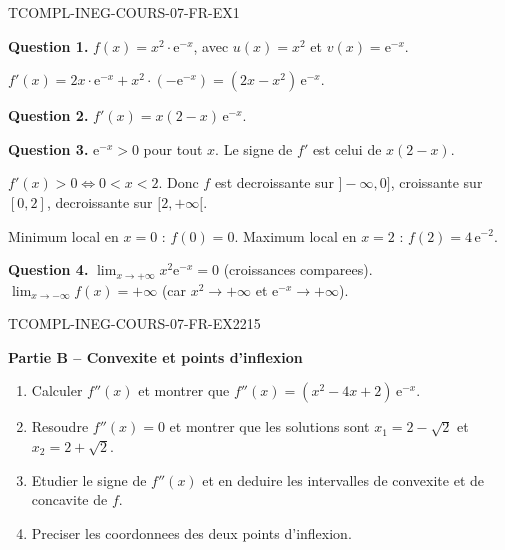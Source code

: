 \begin{corrige}{TCOMPL-INEG-COURS-07-FR-EX1}

\textbf{Question 1.} $f(x) = x^2 \cdot \mathrm{e}^{-x}$, avec $u(x) = x^2$ et $v(x) = \mathrm{e}^{-x}$.

$f'(x) = 2x \cdot \mathrm{e}^{-x} + x^2 \cdot (-\mathrm{e}^{-x}) = (2x - x^2)\,\mathrm{e}^{-x}$.

\textbf{Question 2.} $f'(x) = x(2-x)\,\mathrm{e}^{-x}$.

\textbf{Question 3.} $\mathrm{e}^{-x} > 0$ pour tout $x$. Le signe de $f'$ est celui de $x(2-x)$.

$f'(x) > 0 \iff 0 < x < 2$. Donc $f$ est decroissante sur $]-\infty, 0]$, croissante sur $[0, 2]$, decroissante sur $[2, +\infty[$.

Minimum local en $x = 0$ : $f(0) = 0$. Maximum local en $x = 2$ : $f(2) = 4\,\mathrm{e}^{-2}$.

\textbf{Question 4.} $\lim_{x \to +\infty} x^2 \mathrm{e}^{-x} = 0$ (croissances comparees). $\lim_{x \to -\infty} f(x) = +\infty$ (car $x^2 \to +\infty$ et $\mathrm{e}^{-x} \to +\infty$).

\end{corrige}

\bigskip


\begin{exercice}{TCOMPL-INEG-COURS-07-FR-EX2}{2}{15}

\textbf{Partie B -- Convexite et points d'inflexion}

\begin{enumerate}
  \item Calculer $f''(x)$ et montrer que $f''(x) = (x^2 - 4x + 2)\,\mathrm{e}^{-x}$.
  \item Resoudre $f''(x) = 0$ et montrer que les solutions sont $x_1 = 2 - \sqrt{2}$ et $x_2 = 2 + \sqrt{2}$.
  \item Etudier le signe de $f''(x)$ et en deduire les intervalles de convexite et de concavite de $f$.
  \item Preciser les coordonnees des deux points d'inflexion.
\end{enumerate}

\end{exercice}

